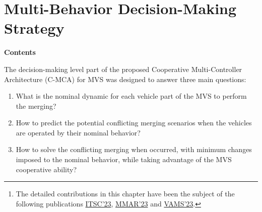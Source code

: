 
\chapter{Multi-Behavior Decision-Making Strategy}
\label{Chap05}
\begin{abstract}
    This chapter is dedicated to draw the details related to the decision-making level part of the proposed Cooperative Multi-Controller Architecture (C-MCA) for MVS performing on-ramp merging on highway, thus under the prisme of safety, passenger comfort, and energy efficiency. The proposed multi-behavior selection strategy predicts the safety assessment during the merging scenario based on a nominal behavior of the MVS. Based on the safety criterion, the optimal behavior of the MVS is chosen, either to perform the merging in a nominal manner, or to overcome a conflicting situation in a cooperative manner \footnote{The detailed contributions in this chapter have been the subject of the following publications  \hyperlink{ITSC23}{ITSC'23}, \hyperlink{MMAR23}{MMAR'23} and \hyperlink{VAMS23}{VAMS'23}.}.
    
\end{abstract}


\textbf{Contents}
\vspace{0.15cm}
\hline
\hspace{2cm}
\localtableofcontents
\hspace{2cm}
\hline
\hspace{2cm}



The decision-making level part of the proposed Cooperative Multi-Controller Architecture (C-MCA) for MVS was designed to answer three main questions: 
\begin{enumerate}
    \item What is the nominal dynamic for each vehicle part of the MVS to perform the merging?%

    \item How to predict the potential conflicting merging scenarios when the vehicles are operated by their nominal behavior?

    \item How to solve the conflicting merging when occurred, with minimum changes imposed to the nominal behavior, while taking advantage of the MVS cooperative ability? 
\end{enumerate}





